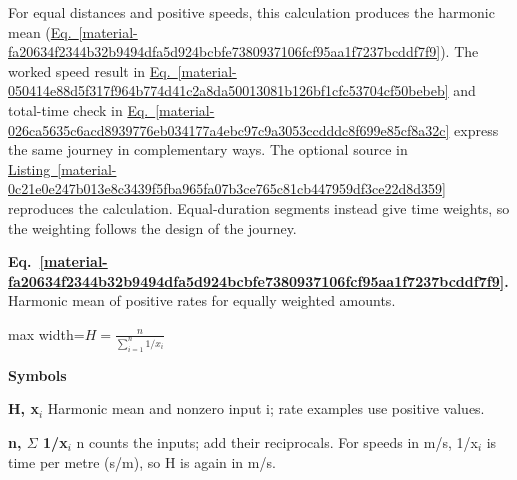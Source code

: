 \documentclass[11pt,a4paper]{article}
\begin{document}
For equal distances and positive speeds, this calculation produces the harmonic mean (\hyperref[material-fa20634f2344b32b9494dfa5d924bcbfe7380937106fcf95aa1f7237bcddf7f9]{Eq.~\ref*{material-fa20634f2344b32b9494dfa5d924bcbfe7380937106fcf95aa1f7237bcddf7f9}}). The worked speed result in \hyperref[material-050414e88d5f317f964b774d41c2a8da50013081b126bf1cfc53704cf50bebeb]{Eq.~\ref*{material-050414e88d5f317f964b774d41c2a8da50013081b126bf1cfc53704cf50bebeb}} and total-time check in \hyperref[material-026ca5635c6acd8939776eb034177a4ebc97c9a3053ccdddc8f699e85cf8a32c]{Eq.~\ref*{material-026ca5635c6acd8939776eb034177a4ebc97c9a3053ccdddc8f699e85cf8a32c}} express the same journey in complementary ways. The optional source in \hyperref[material-0c21e0e247b013e8c3439f5fba965fa07b3ce765c81cb447959df3ce22d8d359]{Listing~\ref*{material-0c21e0e247b013e8c3439f5fba965fa07b3ce765c81cb447959df3ce22d8d359}} reproduces the calculation. Equal-duration segments instead give time weights, so the weighting follows the design of the journey.


\par\medskip
\noindent\begin{minipage}{\linewidth}
\label{material-fa20634f2344b32b9494dfa5d924bcbfe7380937106fcf95aa1f7237bcddf7f9}
\noindent\textbf{Eq.~\ref*{material-fa20634f2344b32b9494dfa5d924bcbfe7380937106fcf95aa1f7237bcddf7f9}.} Harmonic mean of positive rates for equally weighted amounts.\par\nopagebreak
\begin{center}\begin{adjustbox}{max width=\linewidth}$\displaystyle H = \frac{n}{\sum_{i=1}^{n} 1/x_i}$\end{adjustbox}\end{center}

\par\noindent\textbf{Symbols}

\par\noindent\textbf{H, x\ensuremath{{}_i}} Harmonic mean and nonzero input i; rate examples use positive values.

\par\noindent\textbf{n, \ensuremath{\Sigma} 1/x\ensuremath{{}_i}} n counts the inputs; add their reciprocals. For speeds in m/s, 1/x\ensuremath{{}_i} is time per metre (s/m), so H is again in m/s.

\end{minipage}\par
\medskip
\end{document}
